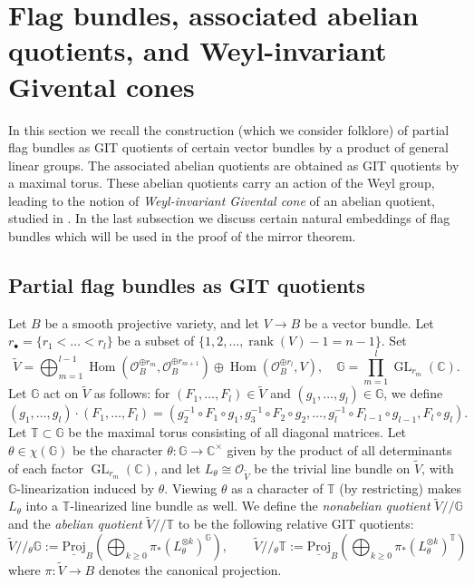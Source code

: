 \documentclass[a4paper,12pt]{amsart}
\numberwithin{equation}{section}
\theoremstyle{definition}
\newcommand{\C}{\mathbb{C}}
\newcommand{\G}{\mathbb{G}}
\newcommand{\T}{\mathbb{T}}
\newcommand{\cO}{\mathcal{O}}
\newcommand{\rank}{\operatorname{rank}}
\newcommand{\GL}{\operatorname{GL}}
\newcommand{\Hom}{\operatorname{Hom}}
\begin{document}
\section{Flag bundles, associated abelian quotients, and Weyl-invariant Givental cones}\label{sec:flag_bundles}
In this section we recall the construction (which we consider folklore) of partial flag bundles as GIT quotients of 
certain vector bundles by a product of general linear groups. The associated abelian quotients are obtained as GIT quotients by a maximal torus. These abelian quotients carry an action of the Weyl group, leading to the notion of \emph{Weyl-invariant Givental cone} of an abelian quotient, studied in \cite{CLS}. In the last subsection we discuss certain natural embeddings of flag bundles which will be used in the proof of the mirror theorem.  

\subsection{Partial flag bundles as GIT quotients}\label{subsection: flag_bundles_GIT}
Let $B$ be a smooth projective variety, and let $V\to B$ be a vector bundle.
Let $r_\bullet=\{r_1<\dots<r_l\}$ be a subset of $\{1,2,\dots,\rank(V)-1=n-1\}$.
Set
\[
\widetilde{V}=\bigoplus_{m=1}^{l-1}\Hom(\cO_B^{\oplus r_m},\cO_B^{\oplus r_{m+1}})\oplus\Hom(\cO_B^{\oplus r_l},V), \quad \G=\prod_{m=1}^{l}\GL_{r_m}(\C). 
\]
Let $\G$ act on $\widetilde{V}$ as follows: for $(F_1,\dots,F_l)\in\widetilde{V}$ and $(g_1,\dots,g_l)\in\G$, we define
\[
(g_1,\dots,g_l)\cdot(F_1,\dots,F_l) = (g_2^{-1}\circ F_1\circ g_1,g_3^{-1}\circ F_2\circ g_2,\dots,g_l^{-1}\circ F_{l-1}\circ g_{l-1},F_l\circ g_l).
\]
Let $\T\subset\G$ be the maximal torus consisting of all diagonal matrices.
Let $\theta\in\chi(\G)$ be the character $\theta\colon\G\to\C^\times$ given by the product of all determinants of each factor $\GL_{r_m}(\C)$, and let $L_\theta\cong\cO_{\widetilde{V}}$ be the trivial line bundle on $\widetilde{V}$, with $\G$-linearization induced by $\theta$. Viewing $\theta$ as a character of $\T$ (by restricting) makes $L_\theta$ into a $\T$-linearized line bundle as well.
We define the \emph{nonabelian quotient} $\widetilde{V}/\!/\G$ and the \emph{abelian quotient} $\widetilde{V}/\!/\T$ to be the following relative GIT quotients:
\[
\widetilde{V}/\!/\!_{\theta}\G := \underline{\mathrm{Proj}}_B \left( \bigoplus_{k\geq0} \pi_*\left(L_\theta^{\otimes k}\right)^\G \right),\qquad \widetilde{V}/\!/\!_{\theta}\T := \underline{\mathrm{Proj}}_B \left( \bigoplus_{k\geq0} \pi_*\left(L_\theta^{\otimes k}\right)^\T \right)
\]
where $\pi\colon\widetilde{V}\to B$ denotes the canonical projection. 
\end{document}
